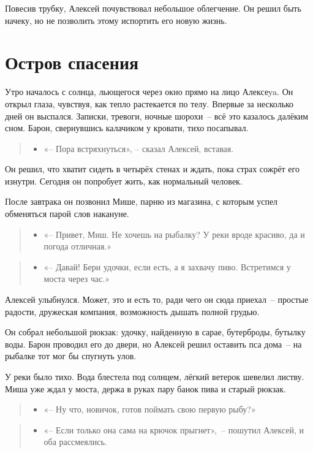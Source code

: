 \documentclass[12pt,a4paper]{book}
\newenvironment{dialogue}{\begin{quote}\itshape\begin{itemize}\item[]}{\end{itemize}\end{quote}}
\begin{document}
Повесив трубку, Алексей почувствовал небольшое облегчение. Он решил быть начеку, но не позволить этому испортить его новую жизнь.

\chapter{Остров спасения}

Утро началось с солнца, льющегося через окно прямо на лицо Алексеya. Он открыл глаза, чувствуя, как тепло растекается по телу. Впервые за несколько дней он выспался. Записки, тревоги, ночные шорохи~-- всё это казалось далёким сном. Барон, свернувшись калачиком у кровати, тихо посапывал.

\begin{dialogue}
    «-- Пора встряхнуться», -- сказал Алексей, вставая.
\end{dialogue}

Он решил, что хватит сидеть в четырёх стенах и ждать, пока страх сожрёт его изнутри. Сегодня он попробует жить, как нормальный человек.

После завтрака он позвонил Мише, парню из магазина, с которым успел обменяться парой слов накануне.

\begin{dialogue}
«-- Привет, Миш. Не хочешь на рыбалку? У реки вроде красиво, да и погода отличная.»
\end{dialogue}

\begin{dialogue}
«-- Давай! Бери удочки, если есть, а я захвачу пиво. Встретимся у моста через час.»
\end{dialogue}

Алексей улыбнулся. Может, это и есть то, ради чего он сюда приехал~-- простые радости, дружеская компания, возможность дышать полной грудью.

Он собрал небольшой рюкзак: удочку, найденную в сарае, бутерброды, бутылку воды. Барон проводил его до двери, но Алексей решил оставить пса дома~-- на рыбалке тот мог бы спугнуть улов.

У реки было тихо. Вода блестела под солнцем, лёгкий ветерок шевелил листву. Миша уже ждал у моста, держа в руках пару банок пива и старый рюкзак.

\begin{dialogue}
«-- Ну что, новичок, готов поймать свою первую рыбу?»
\end{dialogue}

\begin{dialogue}
«-- Если только она сама на крючок прыгнет»,~-- пошутил Алексей, и оба рассмеялись.
\end{dialogue}
\end{document}
